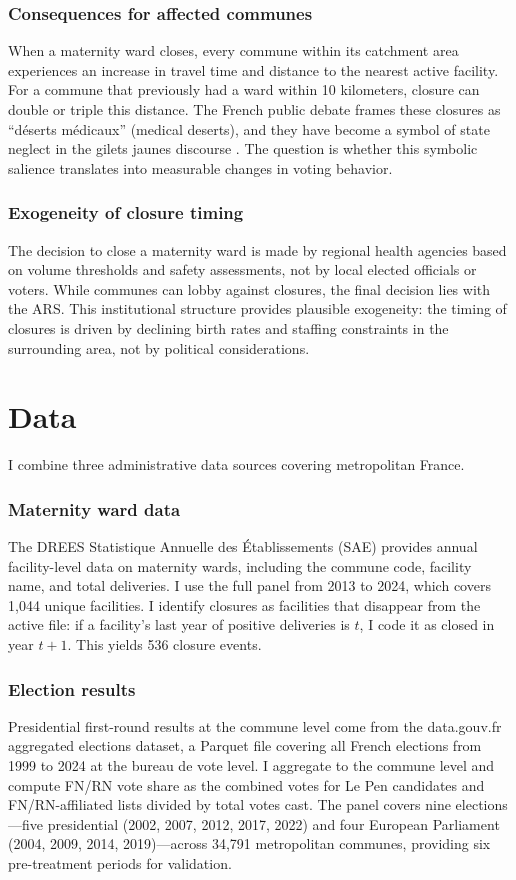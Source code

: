 \documentclass[12pt]{article}
\begin{document}
\subsubsection*{Consequences for affected communes} When a maternity ward closes, every commune within its catchment area experiences an increase in travel time and distance to the nearest active facility. For a commune that previously had a ward within 10 kilometers, closure can double or triple this distance. The French public debate frames these closures as ``d\'{e}serts m\'{e}dicaux'' (medical deserts), and they have become a symbol of state neglect in the gilets jaunes discourse \citep{noiriel2019gilets}. The question is whether this symbolic salience translates into measurable changes in voting behavior.

\subsubsection*{Exogeneity of closure timing} The decision to close a maternity ward is made by regional health agencies based on volume thresholds and safety assessments, not by local elected officials or voters. While communes can lobby against closures, the final decision lies with the ARS. This institutional structure provides plausible exogeneity: the timing of closures is driven by declining birth rates and staffing constraints in the surrounding area, not by political considerations.


\section{Data}

I combine three administrative data sources covering metropolitan France.

\subsubsection*{Maternity ward data} The DREES Statistique Annuelle des \'{E}tablissements (SAE) provides annual facility-level data on maternity wards, including the commune code, facility name, and total deliveries. I use the full panel from 2013 to 2024, which covers 1,044 unique facilities. I identify closures as facilities that disappear from the active file: if a facility's last year of positive deliveries is $t$, I code it as closed in year $t+1$. This yields 536 closure events.

\subsubsection*{Election results} Presidential first-round results at the commune level come from the data.gouv.fr aggregated elections dataset, a Parquet file covering all French elections from 1999 to 2024 at the bureau de vote level. I aggregate to the commune level and compute FN/RN vote share as the combined votes for Le Pen candidates and FN/RN-affiliated lists divided by total votes cast. The panel covers nine elections---five presidential (2002, 2007, 2012, 2017, 2022) and four European Parliament (2004, 2009, 2014, 2019)---across 34,791 metropolitan communes, providing six pre-treatment periods for validation.
\end{document}
